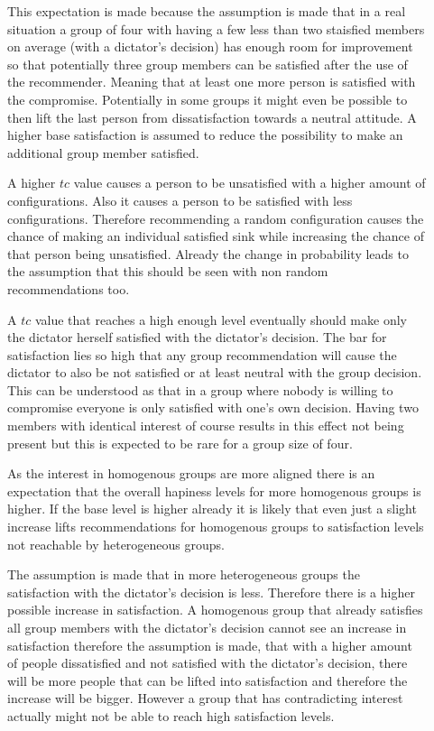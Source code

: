 \begin{description}
    \item[] This expectation is made because the assumption is made that in a real situation a group of four with having a few less than two staisfied members on average (with a dictator's decision) has enough room for improvement so that potentially three group members can be satisfied after the use of the recommender. Meaning that at least one more person is satisfied with the compromise. Potentially in some groups it might even be possible to then lift the last person from dissatisfaction towards a neutral attitude. A higher base satisfaction is assumed to reduce the possibility to make an additional group member satisfied.
    \item[] A higher $tc$ value causes a person to be unsatisfied with a higher amount of configurations. Also it causes a person to be satisfied with less configurations. Therefore recommending a random configuration causes the chance of making an individual satisfied sink while increasing the chance of that person being unsatisfied. Already the change in probability leads to the assumption that this should be seen with non random recommendations too.
    \item[] A $tc$ value that reaches a high enough level eventually should make only the dictator herself satisfied with the dictator's decision. The bar for satisfaction lies so high that any group recommendation will cause the dictator to also be not satisfied or at least neutral with the group decision. This can be understood as that in a group where nobody is willing to compromise everyone is only satisfied with one's own decision. Having two members with identical interest of course results in this effect not being present but this is expected to be rare for a group size of four. 
    \item[] As the interest in homogenous groups are more aligned there is an expectation that the overall hapiness levels for more homogenous groups is higher. If the base level is higher already it is likely that even just a slight increase lifts recommendations for homogenous groups to satisfaction levels not reachable by heterogeneous groups.
    \item[] The assumption is made that in more heterogeneous groups the satisfaction with the dictator's decision is less. Therefore there is a higher possible increase in satisfaction. A homogenous group that already satisfies all group members with the dictator's decision cannot see an increase in satisfaction therefore the assumption is made, that with a higher amount of people dissatisfied and not satisfied with the dictator's decision, there will be more people that can be lifted into satisfaction and therefore the increase will be bigger. However a group that has contradicting interest actually might not be able to reach high satisfaction levels.

\end{description}
